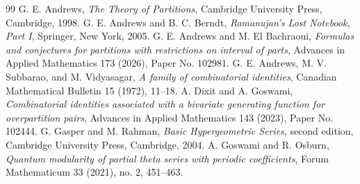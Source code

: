 \documentclass[reqno]{amsart}
\theoremstyle{definition}
\theoremstyle{plain}
\theoremstyle{remark}
\numberwithin{equation}{section}
\begin{document}



\begin{thebibliography}{99}
%
G. E. Andrews,
\emph{The Theory of Partitions},
Cambridge University Press, Cambridge, 1998.
%
G. E. Andrews and B. C. Berndt,
\emph{Ramanujan's Lost Notebook, Part {I}},
Springer, New York, 2005.
%
G. E. Andrews and M. El Bachraoui,
\emph{Formulas and conjectures for partitions with restrictions on interval of parts},
Advances in Applied Mathematics 173 (2026), Paper No. 102981.
%
G. E. Andrews, M. V. Subbarao, and M. Vidyasagar,
\emph{A family of combinatorial identities},
Canadian Mathematical Bulletin 15 (1972), 11--18.
%
A. Dixit and A. Goswami,
\emph{Combinatorial identities associated with a bivariate generating function for overpartition pairs},
Advances in Applied Mathematics 143 (2023), Paper No. 102444.
%
G. Gasper and M. Rahman,
\emph{Basic Hypergeometric Series}, second edition,
Cambridge University Press, Cambridge, 2004.
%
A. Goswami and R. Osburn,
\emph{Quantum modularity of partial theta series with periodic coefficients},
Forum Mathematicum 33 (2021), no. 2, 451--463.
\end{thebibliography}

%
\end{document}
